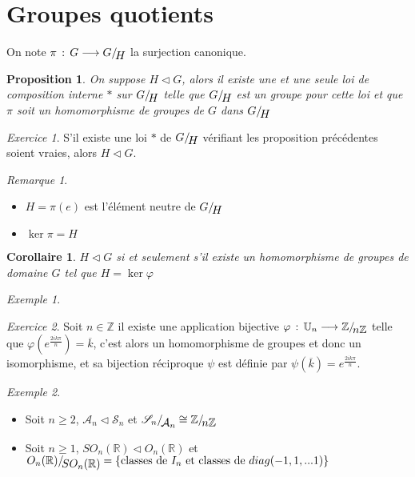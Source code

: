\documentclass[]{article}
\newtheorem{myproposition}{Proposition}
\newtheorem{mycor}{Corollaire}
\theoremstyle{remark}
\newtheorem{myrem}{Remarque}
\newtheorem{myexer}{Exercice}
\newtheorem{myexmpl}{Exemple}
\theoremstyle{definition}
\newcommand{\funcshort}[3]{
#1 \, : \, #2 \longrightarrow #3
}
\newcommand*{\ClGa}[2]%
{\ensuremath{%
    #1/\!\raisebox{-.65ex}{\ensuremath{#2}}}}
\begin{document}
\section{Groupes quotients}

On note $\funcshort{\pi}{G}{\ClGa{G}{H}}$ la surjection canonique.

\begin{myproposition}
	On suppose $H \vartriangleleft G$, alors il existe une et une seule loi de composition interne $*$ sur $\ClGa{G}{H}$ telle que $\ClGa{G}{H}$ est un groupe pour cette loi et que $\pi$ soit un homomorphisme de groupes de $G$ dans $\ClGa{G}{H}$
\end{myproposition}

\begin{myexer}
	S'il existe une loi $*$ de $\ClGa{G}{H}$ vérifiant les proposition précédentes soient vraies, alors $H \vartriangleleft G$.
\end{myexer}

\begin{myrem}
	\leavevmode
	\begin{itemize}
		\item $H= \pi(e)$ est l'élément neutre de $\ClGa{G}{H}$
		\item $\ker \pi = H$
	\end{itemize}
\end{myrem}

\begin{mycor}
	$H \vartriangleleft G$ si et seulement s'il existe un homomorphisme de groupes de domaine $G$ tel que $H = \ker \varphi$
\end{mycor}

\begin{myexmpl}
	\leavevmode
	
\end{myexmpl}

\begin{myexer}
	Soit $n \in \mathbb{Z}$ il existe une application bijective $\funcshort{\varphi}{\mathbb{U}_n}{\ClGa{\mathbb{Z}}{n\mathbb{Z}}}$ telle que $\varphi(e^{\frac{2i k \pi}{n}})=\overline{k}$, c'est alors un homomorphisme de groupes et donc un isomorphisme, et sa bijection réciproque $\psi$ est définie par $\psi(\overline{k})=e^{\frac{2i k \pi}{n}}$.
\end{myexer}

\begin{myexmpl}
	\leavevmode
	\begin{itemize}
		\item Soit $n \geqslant 2$, $\mathcal{A}_n \vartriangleleft \mathscr{S}_n$ et $\ClGa{\mathscr{S}_n}{\mathcal{A}_n} \cong \ClGa{\mathbb{Z}}{n\mathbb{Z}}$
		
		\item Soit $n \geqslant 1$, $SO_n(\mathbb{R}) \vartriangleleft O_n(\mathbb{R})$ et $\ClGa{O_n(\mathbb{R})}{SO_n(\mathbb{R})} = \{\text{classes de $I_n$ et classes de $diag(-1, 1, ...1)$}\}$
	\end{itemize}
\end{myexmpl}
\end{document}
